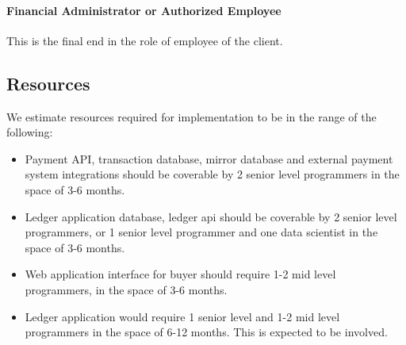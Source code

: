 \paragraph{Financial Administrator or Authorized Employee} This is the final
end in the role of employee of the client.

\subsection{Resources}
We estimate resources required for implementation to be in the range of the
following:

\begin{itemize}
	\item Payment API, transaction database, mirror database and external
	payment system integrations should be coverable by 2 senior level
	programmers in the space of 3-6 months.
	\item Ledger application database, ledger api should be coverable by 2
	senior level programmers, or 1 senior level programmer and one data
	scientist in the space of 3-6 months.
	\item Web application interface for buyer should require 1-2 mid level
	programmers, in the space of 3-6 months.
	\item Ledger application would require 1 senior level and 1-2 mid level
	programmers in the space of 6-12 months.  This is expected to be
	involved.
\end{itemize}
